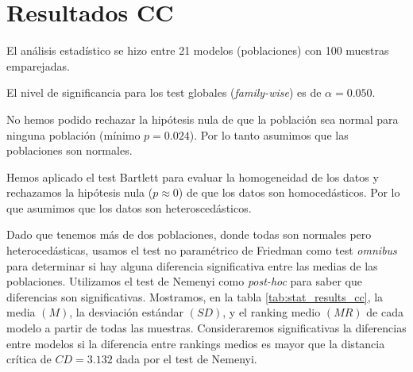 \documentclass[a4paper,oneside,11pt,leqno]{article}
\begin{document}
	\section{Resultados CC}
	\label{sec:results_cc}

	El análisis estadístico se hizo entre 21 modelos (poblaciones) con 100 muestras emparejadas.

	El nivel de significancia para los test globales (\textit{family-wise}) es de $\alpha=0.050$.

	No hemos podido rechazar la hipótesis nula de que la población sea normal para ninguna población (mínimo $p=0.024$). Por lo tanto asumimos que las poblaciones son normales.

	Hemos aplicado el test Bartlett para evaluar la homogeneidad de los datos y rechazamos la hipótesis nula ($p\approx 0$) de que los datos son homocedásticos. Por lo que asumimos que los datos son heteroscedásticos.

	Dado que tenemos más de dos poblaciones, donde todas son normales pero heterocedásticas, usamos el test no paramétrico de Friedman como test \textit{omnibus} para determinar si hay alguna diferencia significativa entre las medias de las poblaciones. Utilizamos el test de Nemenyi como \textit{post-hoc} para saber que diferencias son significativas. Mostramos, en la tabla \ref{tab:stat_results_cc}, la media $(M)$, la desviación estándar $(SD)$, y el ranking medio $(MR)$ de cada modelo a partir de todas las muestras. Consideraremos significativas la diferencias entre modelos si la diferencia entre rankings medios es mayor que la distancia crítica de $CD=3.132$ dada por el test de Nemenyi.
\end{document}
